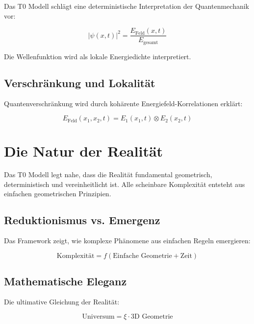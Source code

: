 	Das T0 Modell schlägt eine deterministische Interpretation der Quantenmechanik vor:
	
	\begin{equation}
		|\psi(x,t)|^2 = \frac{E_{\text{Feld}}(x,t)}{E_{\text{gesamt}}}
	\end{equation}
	
	Die Wellenfunktion wird als lokale Energiedichte interpretiert.
	
	\subsection{Verschränkung und Lokalität}
	
	Quantenverschränkung wird durch kohärente Energiefeld-Korrelationen erklärt:
	
	\begin{equation}
		E_{\text{Feld}}(x_1, x_2, t) = E_1(x_1,t) \otimes E_2(x_2,t)
	\end{equation}
	
	
	\section{Die Natur der Realität}
	
	\begin{erkenntnis}
		Das T0 Modell legt nahe, dass die Realität fundamental geometrisch, deterministisch und vereinheitlicht ist. Alle scheinbare Komplexität entsteht aus einfachen geometrischen Prinzipien.
	\end{erkenntnis}
	
	\subsection{Reduktionismus vs. Emergenz}
	
	Das Framework zeigt, wie komplexe Phänomene aus einfachen Regeln emergieren:
	
	\begin{equation}
		\text{Komplexität} = f(\text{Einfache Geometrie} + \text{Zeit})
	\end{equation}
	
	\subsection{Mathematische Eleganz}
	
	Die ultimative Gleichung der Realität:
	
	\begin{equation}
		\boxed{\text{Universum} = \xi \cdot \text{3D Geometrie}}
	\end{equation}
	
